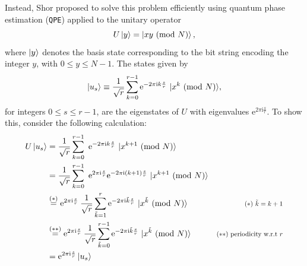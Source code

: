 Instead, Shor proposed to solve this problem efficiently using quantum phase estimation (\texttt{QPE}) applied to the unitary operator
\begin{equation}
    U\ket{{y}} = \ket{{x}{y}\ (\mathrm{mod}\ N)},
\end{equation}
where $\ket{{y}}$ denotes the basis state corresponding to the bit string encoding the integer $y$, with $0\leq y\leq N-1$. The states given by
\begin{equation}
    \left|u_s\right\rangle \equiv \frac{1}{\sqrt{r}} \sum_{k=0}^{r-1} \mathrm{e}^{-2 \pi \mathrm{i} k\frac{s}{r}}\ |x^k \ (\mathrm{mod}\ N)\rangle,
\end{equation}
for integers $0\leq s\leq r-1$, are the eigenstates of $U$ with eigenvalues $\mathrm{e}^{2 \pi \mathrm{i} \frac{s}{r}}$. To show this, consider the following calculation:
\begin{equation}
\begin{aligned}
 U\left|u_s\right\rangle 
 & =\frac{1}{\sqrt{r}} \sum_{k=0}^{r-1}\ \mathrm{e}^{-2 \pi \mathrm{i} k\frac{s}{r}}\ |x^{k+1} \Mod{N}\rangle \\
& =\frac{1}{\sqrt{r}} \sum_{k=0}^{r-1}\ \mathrm{e}^{2 \pi \mathrm{i} \frac{s}{r}} \mathrm{e}^{-2 \pi \mathrm{i} (k+1)\frac{s}{r}}\ |x^{k+1} \Mod{N}\rangle \\
& \stackrel{(*)}{=} \mathrm{e}^{2 \pi \mathrm{i} \frac{s}{r}}\: \frac{1}{\sqrt{r}} \sum_{\tilde{k}=1}^r \mathrm{e}^{-2 \pi \mathrm{i} \tilde{k}\frac{s}{r}}\ |x^{\tilde{k}} \Mod{N}\rangle\qquad&\scalemath{0.8}{(*)\ \tilde{k}=k+1}\\
& \stackrel{(**)}{=}\mathrm{e}^{2 \pi \mathrm{i} \frac{s}{r}}\: \frac{1}{\sqrt{r}} \sum_{\tilde{k}=0}^{r-1} \mathrm{e}^{-2 \pi \mathrm{i} \tilde{k}\frac{s}{r}}\ |x^{\tilde{k}} \Mod{N}\rangle\qquad&\scalemath{0.8}{(**)\ \mathrm{periodicity\ w.r.t\ }r}\\
& =\mathrm{e}^{2 \pi \mathrm{i} \frac{s}{r}}\left|u_s\right\rangle
\end{aligned}
\end{equation}


